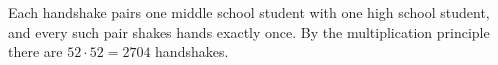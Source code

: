 Each handshake pairs one middle school student with one high school student, and every such pair shakes hands exactly once. By the multiplication principle there are $52\cdot52=\boxed{2704}$ handshakes.
